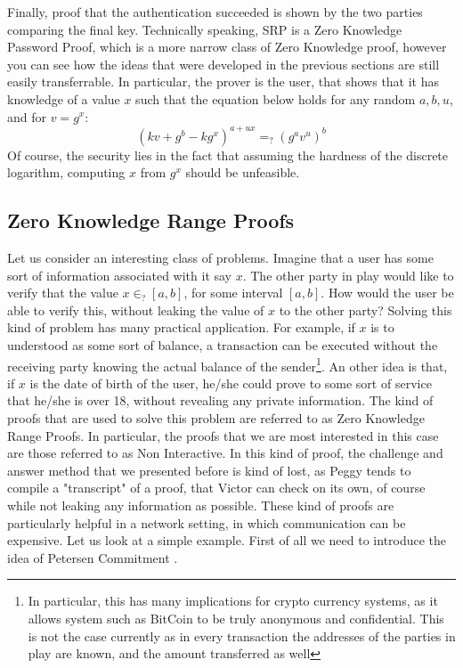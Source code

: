 \documentclass{article}
\begin{document}
Finally, proof that the authentication succeeded is shown by the two parties comparing the final key.
Technically speaking, SRP is a Zero Knowledge Password Proof, which is a more narrow class of Zero Knowledge proof,
however you can see how the ideas that were developed in the previous sections are still easily transferrable.
In particular, the prover is the user, that shows that it has knowledge of a value $x$ such that the equation 
below holds for any random $a, b, u$, and for $v = g^x$:
\[ (kv + g^b - kg^x)^{a + ux} =_? (g^a v^u)^b \]
Of course, the security lies in the fact that assuming the hardness of the discrete logarithm, computing 
$x$ from $g^x$ should be unfeasible.
\subsection{Zero Knowledge Range Proofs}
\label{zkrp}
Let us consider an interesting class of problems. Imagine that a user has some sort of information associated
with it say $x$. The other party in play would like to verify that the value $x \in_? [a, b]$, for some 
interval $[a, b]$. How would the user be able to verify this, without leaking the value of $x$ to the 
other party? Solving this kind of problem has many practical application. For example, if $x$ is to 
understood as some sort of balance, a transaction can be executed without the receiving party knowing the 
actual balance of the sender\footnote{In particular, this has many implications for crypto currency systems,
as it allows system such as BitCoin to be truly anonymous and confidential. This is not the case currently
as in every transaction the addresses of the parties in play are known, and the amount transferred as well}.
An other idea is that, if $x$ is the date of birth of the user, he/she could 
prove to some sort of service that he/she is over 18, without revealing any private information. The kind 
of proofs that are used to solve this problem are referred to as Zero Knowledge Range Proofs. In particular,
the proofs that we are most interested in this case are those referred to as Non Interactive. In this kind 
of proof, the challenge and answer method that we presented before is kind of lost, as Peggy tends to 
compile a "transcript" of a proof, that Victor can check on its own, of course while not leaking any information 
as possible. These kind of proofs are particularly helpful in a network setting, in which communication can 
be expensive. Let us look at a simple example. First of all we need to introduce the idea of Petersen Commitment \cite{pedersenNonInteractiveInformationTheoreticSecure1992}.
\end{document}
